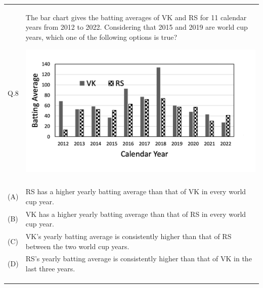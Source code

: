 \documentclass[12pt]{article}
\begin{document}
\begin{table}[H]
\renewcommand{\arraystretch}{2.8}
\setlength{\tabcolsep}{8pt}
\begin{tabular}{|l|p{15cm}|}
\hline
 & \\ \hline
Q.8 & The bar chart gives the batting averages of VK and RS for 11 calendar years from
2012 to 2022. Considering that 2015 and 2019 are world cup years, which one of
the following options is true?

\includegraphics[scale=0.7]{LatexGraph.png}
 \\ \hline
 & \\ \hline
(A)& RS has a higher yearly batting average than that of VK in every world cup year. \\ \hline
(B)&VK has a higher yearly batting average than that of RS in every world cup year.\\ \hline
(C)&VK’s yearly batting average is consistently higher than that of RS between the two
world cup years. \\ \hline
(D)& RS’s yearly batting average is consistently higher than that of VK in the last three
years.\\ \hline
 & \\ 
 & \\ 
 & \\  \hline







\end{tabular}
\end{table}

\newpage
\end{document}
